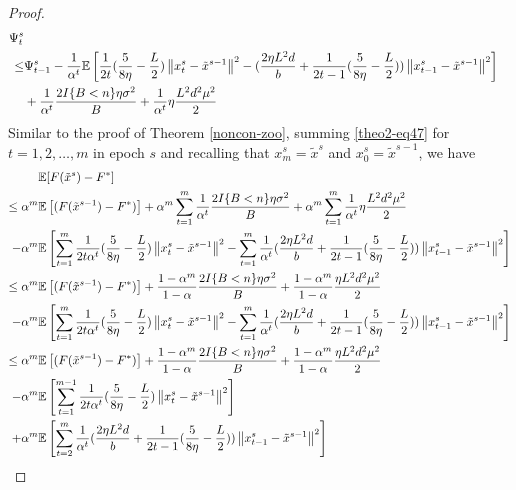 \documentclass{article}
\newcommand*{\E}{\mathbb{E}}
\newcommand{\norm}[1]{\left\lVert#1\right\rVert}
\theoremstyle{definition}
\theoremstyle{remark}
\begin{document}
\begin{proof}
{\color{Brown}
\begin{align} 
\Psi_t^s \notag
\\ \leq& \Psi_{t-1}^s - \frac{1}{\alpha^t}\E\left[ \frac{1}{2t}(\frac{5}{8\eta} - \frac{L}{2})\norm{{x}_t^s-\tilde{x}^{s-1}}^2-(\frac{2\eta L^2 d}{b}+\frac{1}{2t-1}(\frac{5}{8\eta} - \frac{L}{2}))\norm{x_{t-1}^s-\tilde{x}^{s-1}}^2\right]\notag\\
&+ \frac{1}{\alpha^t}\frac{2I\{B < n\}\eta \sigma ^2}{B}+\frac{1}{\alpha^t}\eta \frac{L^2 d^2 \mu^2}{2}\label{theo2-eq47}
 \end{align}
 }
Similar to the proof of Theorem \ref{noncon-zoo}, summing \eqref{theo2-eq47} for $t=1, 2, \ldots, m$ in epoch $s$ and recalling that $x_m^s = \tilde{x}^s$ and $x_0^s = \tilde{x}^{s-1}$, we have 
{\color{Brown}
\begin{align}
\E&[F(\tilde{x}^s)-F^*]\notag\\
\leq\alpha^m\E&\left[(F(\tilde{x}^{s-1}) - F^*)\right] +\alpha^m\sum_{t=1}^m \frac{1}{\alpha^t}\frac{2I\{B < n\}\eta \sigma ^2}{B}+\alpha^m\sum_{t=1}^m \frac{1}{\alpha^t}\eta \frac{L^2 d^2 \mu^2}{2}\notag
\\-\alpha^m\E&\left[\sum_{t=1}^m\frac{1}{2t\alpha^t}(\frac{5}{8\eta} - \frac{L}{2})\norm{{x}_t^s-\tilde{x}^{s-1}}^2-\sum_{t=1}^m\frac{1}{\alpha^t}(\frac{2\eta L^2 d}{b}+\frac{1}{2t-1}(\frac{5}{8\eta} - \frac{L}{2})) \norm{x_{t-1}^s-\tilde{x}^{s-1}}^2 \right]\notag\\
\leq\alpha^m\E&\left[(F(\tilde{x}^{s-1}) - F^*)\right] + \frac{1-\alpha^m}{1-\alpha}\frac{2I\{B < n\}\eta \sigma ^2}{B}+\frac{1-\alpha^m}{1-\alpha} \frac{\eta L^2 d^2 \mu^2}{2}\notag
\\-\alpha^m\E&\left[\sum_{t=1}^m\frac{1}{2t\alpha^t}(\frac{5}{8\eta} - \frac{L}{2})\norm{{x}_t^s-\tilde{x}^{s-1}}^2-\sum_{t=1}^m\frac{1}{\alpha^t}(\frac{2\eta L^2 d}{b}+\frac{1}{2t-1}(\frac{5}{8\eta} - \frac{L}{2})) \norm{x_{t-1}^s-\tilde{x}^{s-1}}^2 \right]\notag\\
\leq\alpha^m\E&\left[(F(\tilde{x}^{s-1}) - F^*)\right] + \frac{1-\alpha^m}{1-\alpha}\frac{2I\{B < n\}\eta \sigma ^2}{B}+\frac{1-\alpha^m}{1-\alpha}\frac{\eta L^2 d^2 \mu^2}{2}\notag
\\-\alpha^m\E&\left[\sum_{t=1}^{m-1}\frac{1}{2t\alpha^t}(\frac{5}{8\eta} - \frac{L}{2})\norm{{x}_t^s-\tilde{x}^{s-1}}^2\right]\notag\\
+\alpha^m\E&\left[\sum_{t=2}^m\frac{1}{\alpha^t}(\frac{2\eta L^2 d}{b}+\frac{1}{2t-1}(\frac{5}{8\eta} - \frac{L}{2})) \norm{x_{t-1}^s-\tilde{x}^{s-1}}^2 \right]\label{eq48}\\

\end{align}}
\end{proof}
\end{document}
